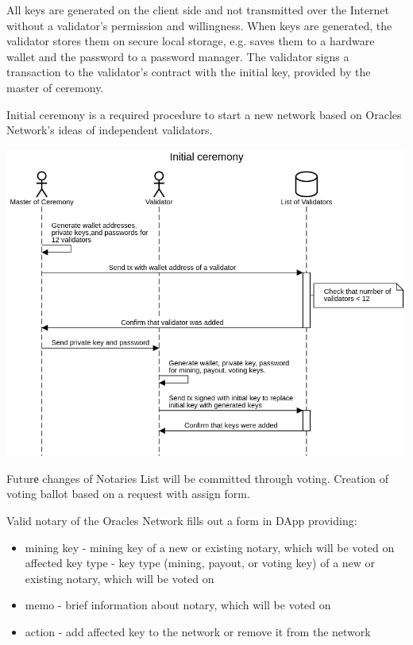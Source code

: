 \documentclass[12pt]{report}
\begin{document}
All keys are generated on the client side and not transmitted over the Internet without a validator’s permission and willingness. When keys are generated, the validator stores them on secure local storage, e.g. saves them to a hardware wallet and the password to a password manager. The validator signs a transaction to the validator’s contract with the initial key, provided by the master of ceremony.

Initial ceremony is a required procedure to start a new network based on Oracles Network’s ideas of independent validators.

\includegraphics[width=\textwidth]{initial}

Futurе changes of Notaries List will be committed through voting. Creation of voting ballot based on a request with assign form.

Valid notary of the Oracles Network fills out a form in DApp providing:
\begin{itemize}
	\item mining key - mining key of a new or existing notary, which will be voted on
affected key type - key type (mining, payout, or voting key) of a new or existing notary, which will be voted on
	\item memo - brief information about notary, which will be voted on
	\item action - add affected key to the network or remove it from the network
\end{itemize}
\end{document}
